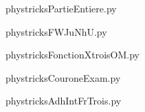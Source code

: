     

    \clearpage
    


    \newcommand{\CaptionFigPartieEntiere}{<+Type your caption here+>}
    \begin{center}
        
    \end{center}
    phystricksPartieEntiere.py

    

    \clearpage
    


    \newcommand{\CaptionFigFWJuNhU}{<+Type your caption here+>}
    \begin{center}
        
    \end{center}
    phystricksFWJuNhU.py

    

    \clearpage
    


    \newcommand{\CaptionFigFonctionXtroisOM}{<+Type your caption here+>}
    \begin{center}
        
    \end{center}
    phystricksFonctionXtroisOM.py

    

    \clearpage
    


    \newcommand{\CaptionFigCouroneExam}{<+Type your caption here+>}
    \begin{center}
        
    \end{center}
    phystricksCouroneExam.py

    

    \clearpage
    


    \newcommand{\CaptionFigAdhIntFrTrois}{<+Type your caption here+>}
    \begin{center}
        
    \end{center}
    phystricksAdhIntFrTrois.py

    

    \clearpage
    


